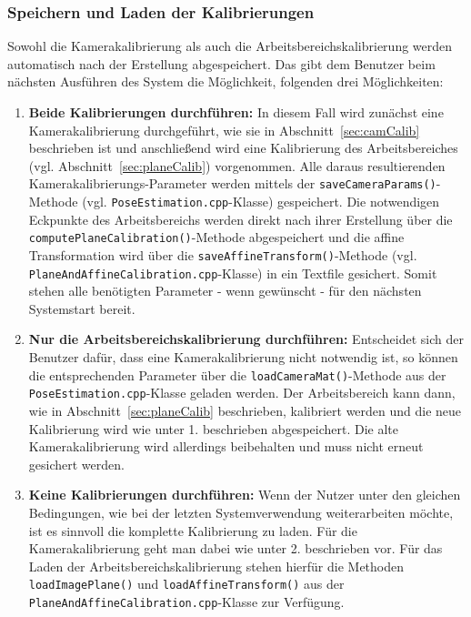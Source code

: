 \subsubsection{Speichern und Laden der Kalibrierungen}\label{sec:saveCalib}
Sowohl die Kamerakalibrierung als auch die Arbeitsbereichskalibrierung werden automatisch nach der Erstellung abgespeichert. Das gibt dem Benutzer beim nächsten Ausführen des System die Möglichkeit, folgenden drei Möglichkeiten: 
\begin{enumerate}
	\item \textbf{Beide Kalibrierungen durchführen:} In diesem Fall wird zunächst eine Kamerakalibrierung durchgeführt, wie sie in Abschnitt~\ref{sec:camCalib} beschrieben ist und anschließend wird eine Kalibrierung des Arbeitsbereiches (vgl. Abschnitt~\ref{sec:planeCalib}) vorgenommen. Alle daraus resultierenden Kamerakalibrierungs-Parameter werden mittels der \texttt{save\-Camera\-Params()}-Methode (vgl. \texttt{Pose\-Estimation.cpp}-Klasse) gespeichert. Die notwendigen Eckpunkte des Arbeitsbereichs werden direkt nach ihrer Erstellung über die \texttt{compute\-Plane\-Calibration()}-Methode abgespeichert und die affine Transformation wird über die \texttt{save\-Affine\-Trans\-form()}-Methode (vgl. \texttt{Plane\-And\-Affine\-Calibration.cpp}-Klasse) in ein Textfile gesichert. Somit stehen alle benötigten Parameter - wenn gewünscht - für den nächsten Systemstart bereit.
	
	\item\textbf{Nur die Arbeitsbereichskalibrierung durchführen:} Entscheidet sich der Benutzer dafür, dass eine Kamerakalibrierung nicht notwendig ist, so können die entsprechenden Parameter über die \texttt{load\-Camera\-Mat()}-Methode aus der \texttt{Pose\-Estimation.cpp}-Klasse geladen werden. Der Arbeitsbereich kann dann, wie in Abschnitt~\ref{sec:planeCalib} beschrieben, kalibriert werden und die neue Kalibrierung wird wie unter 1. beschrieben abgespeichert. Die alte Kamerakalibrierung wird allerdings beibehalten und muss nicht erneut gesichert werden. 
	
	\item\textbf{Keine Kalibrierungen durchführen:} Wenn der Nutzer unter den gleichen Bedingungen, wie bei der letzten Systemverwendung weiterarbeiten möchte, ist es sinnvoll die komplette Kalibrierung zu laden. Für die Kamerakalibrierung geht man dabei wie unter 2. beschrieben vor. Für das Laden der Arbeitsbereichskalibrierung stehen hierfür die Methoden \texttt{load\-Image\-Plane()} und \texttt{load\-Affine\-Transform()} aus der \texttt{Plane\-And\-Affine\-Calibration.cpp}-Klasse zur Verfügung.
\end{enumerate}

